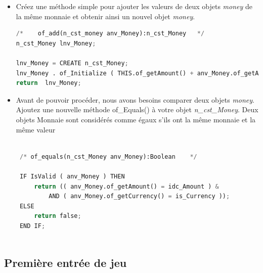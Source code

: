 \documentclass[a4paper,11pt,french]{report}
\theoremstyle{definition}
\begin{document}
\begin{itemize}
\begin{lstlisting}[language=Python, caption=accesseur pour recuperer la monnaie de l'objet \textit{money}]
\end{lstlisting}
\item  Créez une méthode simple pour ajouter les valeurs de deux objets \textit{money} de la même monnaie et obtenir ainsi un nouvel objet \textit{money}.
\begin{lstlisting}[language=Python, caption=Simple addition de deux montants de la même monnaie]
  /*	of_add(n_cst_money anv_Money):n_cst_Money	*/
n_cst_Money	lnv_Money;

lnv_Money = CREATE n_cst_Money;
lnv_Money . of_Initialize ( THIS.of_getAmount() + anv_Money.of_getAmount(), THIS.of_getCurrency( ));
return	lnv_Money;

\end{lstlisting}
\item Avant de pouvoir procéder, nous avons besoins comparer deux objets \textit{money}.  
Ajoutez une nouvelle méthode of\_Equals() à votre objet \textit{n\_cst\_Money}.
 Deux objets Monnaie sont considérés comme égaux s'ils ont la même monnaie et la même valeur
 
 \begin{lstlisting}[language=Python, caption=Comparaison de deux objets \textit{money}]

 /*	of_equals(n_cst_Money anv_Money):Boolean	*/

 IF IsValid ( anv_Money ) THEN
     return (( anv_Money.of_getAmount() = idc_Amount ) &
         AND ( anv_Money.of_getCurrency() = is_Currency ));
 ELSE
     return false;
 END IF;
 
\end{lstlisting}
\end{itemize}

\subsection{Première entrée de jeu}
\end{document}
